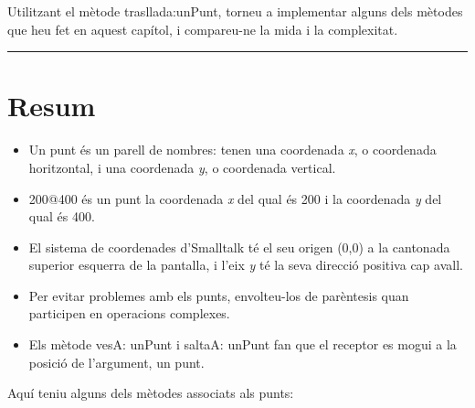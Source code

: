\begin{center}
\colorbox{black}{}
\end{center}
{\small
\noindent
Utilitzant el mètode \textsf{trasllada:unPunt}, torneu a implementar alguns dels mètodes que heu fet en aquest capítol, i compareu-ne la mida i la complexitat.}\\
\noindent
\rule{\textwidth}{3pt}

\section{Resum}
\begin{itemize}
\item Un punt és un parell de nombres: tenen una coordenada \emph{x}, o coordenada horitzontal, i una coordenada \emph{y}, o coordenada vertical.
\item \textsf{200@400} és un punt la coordenada \emph{x} del qual és 200 i la coordenada \emph{y} del qual és 400.
\item El sistema de coordenades d'Smalltalk té el seu origen (0,0) a la cantonada superior esquerra de la pantalla, i l'eix \emph{y} té la seva direcció positiva cap avall.
\item Per evitar problemes amb els punts, envolteu-los de parèntesis quan participen en operacions complexes.
\item Els mètode \textsf{vesA: unPunt} i \textsf{saltaA: unPunt} fan que el receptor es mogui a la posició de l'argument, un punt.
\end{itemize}

\newpage

\noindent
Aquí teniu alguns dels mètodes associats als punts:    
 

\vspace*{3mm}


